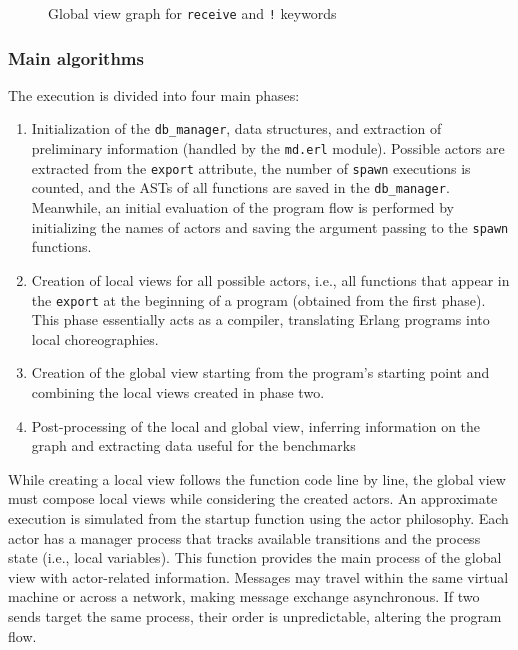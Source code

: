 \begin{figure}[!ht]
    \centering
    \caption{Global view graph for \texttt{receive} and \texttt{!} keywords}
    \label{grafo:sendrecv}
\end{figure}


\subsubsection{Main algorithms}
\noindent The execution is divided into four main phases:
\begin{enumerate}
\item Initialization of the \texttt{db\_manager}, data structures, and
extraction of preliminary information (handled by the
\texttt{md.erl} module). Possible actors are extracted from
the \texttt{export} attribute, the number of \texttt{spawn}
executions is counted, and the ASTs of all functions are saved in
the \texttt{db\_manager}. Meanwhile, an initial evaluation of the
program flow is performed by initializing the names of actors and
saving the argument passing to the \texttt{spawn} functions.

\item Creation of local views for all possible actors, i.e., all functions
that appear in the \texttt{export} at the beginning of a program
(obtained from the first phase). This phase essentially acts as a compiler, 
translating Erlang programs into local choreographies.

\item Creation of the global view starting from the program's starting
point and combining the local views created in phase two.

\item Post-processing of the local and global view, inferring information on the
graph and extracting data useful for the benchmarks
\end{enumerate}

While creating a local view follows the function code line by line, the global  
view must compose local views while considering the created actors. An  
approximate execution is simulated from the startup function using the actor  
philosophy. Each actor has a manager process that tracks available transitions  
and the process state (i.e., local variables). This function provides the main  
process of the global view with actor-related information. Messages may travel  
within the same virtual machine or across a network, making message exchange  
asynchronous. If two sends target the same process, their order  
is unpredictable, altering the program flow.  

